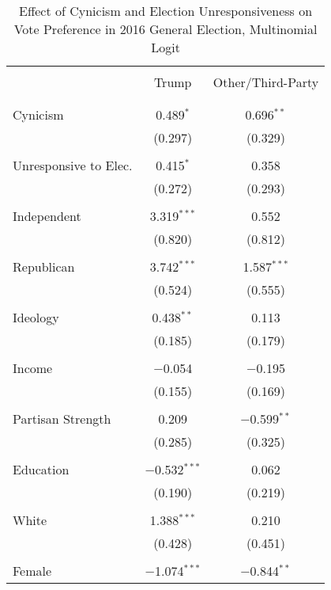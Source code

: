 \documentclass[12pt]{article}
\begin{document}
\begin{appendices}
\begin{refsection}
\begin{table}[!tp] \centering 
  \caption{Effect of Cynicism and Election Unresponsiveness on Vote Preference in 2016 General Election, Multinomial Logit} 
  \label{tab:general-pref} 
   \renewcommand{\arraystretch}{0.8}
\begin{adjustbox}{width=0.6\textwidth,center}
\begin{tabular}{@{\extracolsep{5pt}}lcc} 
\\[-1.8ex]\hline 
 \\[-2ex] 
 & Trump & Other/Third-Party \\ 
\hline \\[-1.8ex] 
\hline \\[-1.8ex] 
 Cynicism & 0.489$^{*}$ & 0.696$^{**}$ \\ 
  & (0.297) & (0.329) \\ 
  & & \\ 
 Unresponsive to Elec. & 0.415$^{*}$ & 0.358 \\ 
  & (0.272) & (0.293) \\ 
  & & \\ 
 Independent & 3.319$^{***}$ & 0.552 \\ 
  & (0.820) & (0.812) \\ 
  & & \\ 
 Republican & 3.742$^{***}$ & 1.587$^{***}$ \\ 
  & (0.524) & (0.555) \\ 
  & & \\ 
 Ideology & 0.438$^{**}$ & 0.113 \\ 
  & (0.185) & (0.179) \\ 
  & & \\ 
 Income & $-$0.054 & $-$0.195 \\ 
  & (0.155) & (0.169) \\ 
  & & \\ 
 Partisan Strength & 0.209 & $-$0.599$^{**}$ \\ 
  & (0.285) & (0.325) \\ 
  & & \\ 
 Education & $-$0.532$^{***}$ & 0.062 \\ 
  & (0.190) & (0.219) \\ 
  & & \\ 
 White & 1.388$^{***}$ & 0.210 \\ 
  & (0.428) & (0.451) \\ 
  & & \\ 
 Female & $-$1.074$^{***}$ & $-$0.844$^{**}$ \\ 

\end{tabular}
\end{adjustbox}
\end{table}
\end{refsection}
\end{appendices}
\end{document}
